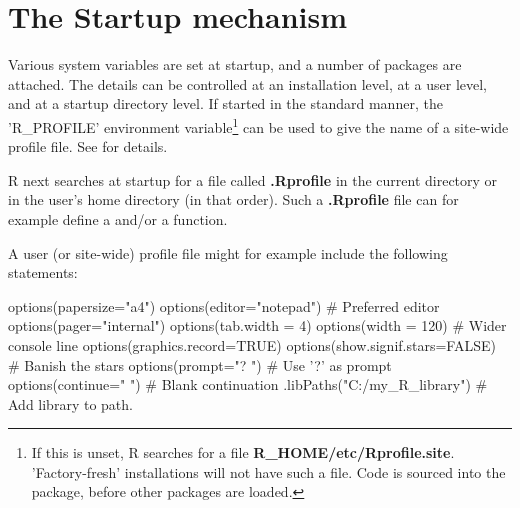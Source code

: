 \section{The Startup mechanism}

Various system variables are set at startup, and a number of packages
are attached.  The details can be controlled at an installation level,
at a user level, and at a startup directory level.  If started in the
standard manner, the 'R\_PROFILE' environment variable\footnote{If
  this is unset, R searches for a file {\bf
    R\_HOME/etc/Rprofile.site}.  'Factory-fresh' installations will
  not have such a file.  Code is sourced into the 
  package, before other packages are loaded.} can be used to give the
name of a site-wide profile file.  See  for
details.

R next searches at startup for a file called \textbf{.Rprofile} in the
current directory or in the user's home directory (in that
order).
Such a \textbf{.Rprofile} file can for example define a
 and/or a  function.

A user (or site-wide) profile file might for example include the
following statements:
\begin{Schunk}
\begin{Sinput}
options(papersize="a4")
options(editor="notepad")         # Preferred editor
options(pager="internal")
options(tab.width = 4)
options(width = 120)              # Wider console line
options(graphics.record=TRUE)
options(show.signif.stars=FALSE)  # Banish the stars
options(prompt="? ")              # Use '?' as prompt
options(continue="  ")            # Blank continuation
.libPaths("C:/my_R_library")      # Add library to path.
\end{Sinput}
\end{Schunk}
